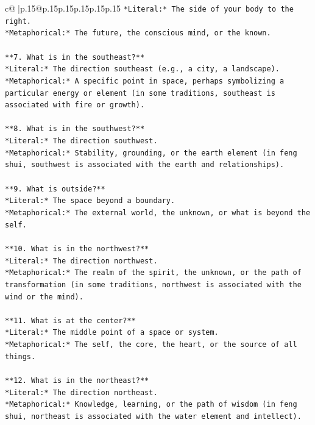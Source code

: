 \documentclass{article}
\begin{document}
{\begin{supertabular}{c@{$\;$}|p{.15\linewidth}@{}p{.15\linewidth}p{.15\linewidth}p{.15\linewidth}p{.15\linewidth}p{.15\linewidth}}
{{{\texttt{*Literal:* The side of your body to the right.  } \\
\texttt{*Metaphorical:* The future, the conscious mind, or the known.} \\
\\ 
\texttt{**7. What is in the southeast?**  } \\
\texttt{*Literal:* The direction southeast (e.g., a city, a landscape).  } \\
\texttt{*Metaphorical:* A specific point in space, perhaps symbolizing a particular energy or element (in some traditions, southeast is associated with fire or growth).} \\
\\ 
\texttt{**8. What is in the southwest?**  } \\
\texttt{*Literal:* The direction southwest.  } \\
\texttt{*Metaphorical:* Stability, grounding, or the earth element (in feng shui, southwest is associated with the earth and relationships).} \\
\\ 
\texttt{**9. What is outside?**  } \\
\texttt{*Literal:* The space beyond a boundary.  } \\
\texttt{*Metaphorical:* The external world, the unknown, or what is beyond the self.} \\
\\ 
\texttt{**10. What is in the northwest?**  } \\
\texttt{*Literal:* The direction northwest.  } \\
\texttt{*Metaphorical:* The realm of the spirit, the unknown, or the path of transformation (in some traditions, northwest is associated with the wind or the mind).} \\
\\ 
\texttt{**11. What is at the center?**  } \\
\texttt{*Literal:* The middle point of a space or system.  } \\
\texttt{*Metaphorical:* The self, the core, the heart, or the source of all things.} \\
\\ 
\texttt{**12. What is in the northeast?**  } \\
\texttt{*Literal:* The direction northeast.  } \\
\texttt{*Metaphorical:* Knowledge, learning, or the path of wisdom (in feng shui, northeast is associated with the water element and intellect).} \\
}}}
\end{supertabular}}
\end{document}
